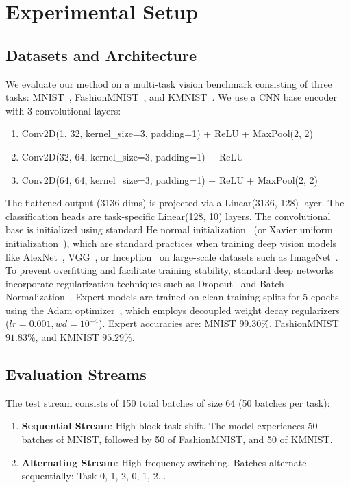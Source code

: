 \documentclass{article}
\theoremstyle{plain}
\theoremstyle{definition}
\theoremstyle{remark}
\begin{document}
\section{Experimental Setup}
\label{sec:experiments}

\subsection{Datasets and Architecture}
We evaluate our method on a multi-task vision benchmark consisting of three tasks: MNIST~\cite{lecun1998gradient}, FashionMNIST~\cite{xiao2017fashion}, and KMNIST~\cite{clanuwat2018deep}. We use a CNN base encoder with 3 convolutional layers:
\begin{enumerate}
    \item Conv2D(1, 32, kernel\_size=3, padding=1) + ReLU + MaxPool(2, 2)
    \item Conv2D(32, 64, kernel\_size=3, padding=1) + ReLU
    \item Conv2D(64, 64, kernel\_size=3, padding=1) + ReLU + MaxPool(2, 2)
\end{enumerate}
The flattened output (3136 dims) is projected via a Linear(3136, 128) layer. The classification heads are task-specific Linear(128, 10) layers. The convolutional base is initialized using standard He normal initialization~\cite{he2015delving} (or Xavier uniform initialization~\cite{glorot2010understanding}), which are standard practices when training deep vision models like AlexNet~\cite{krizhevsky2012imagenet}, VGG~\cite{simonyan2014very}, or Inception~\cite{szegedy2015going} on large-scale datasets such as ImageNet~\cite{deng2009imagenet}. To prevent overfitting and facilitate training stability, standard deep networks incorporate regularization techniques such as Dropout~\cite{srivastava2014dropout} and Batch Normalization~\cite{ioffe2015batch}. Expert models are trained on clean training splits for 5 epochs using the Adam optimizer~\cite{kingma2014adam}, which employs decoupled weight decay regularizers~\cite{loshchilov2017decoupled} ($lr=0.001, wd=10^{-4}$). Expert accuracies are: MNIST $99.30\%$, FashionMNIST $91.83\%$, and KMNIST $95.29\%$.

\subsection{Evaluation Streams}
The test stream consists of 150 total batches of size 64 (50 batches per task):
\begin{enumerate}
    \item \textbf{Sequential Stream}: High block task shift. The model experiences 50 batches of MNIST, followed by 50 of FashionMNIST, and 50 of KMNIST.
    \item \textbf{Alternating Stream}: High-frequency switching. Batches alternate sequentially: Task 0, 1, 2, 0, 1, 2...
\end{enumerate}
\end{document}
